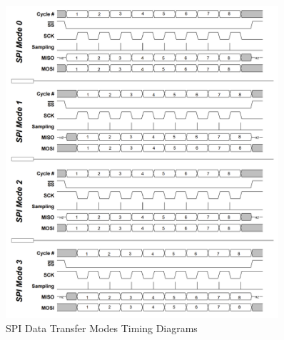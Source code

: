 \begin{figure}[H]
    \centering
    \includegraphics[width=0.9\textwidth]{images/spi_data_modes.png}
    \caption{SPI Data Transfer Modes Timing Diagrams}
    \label{fig:spi_data_modes}
\end{figure}